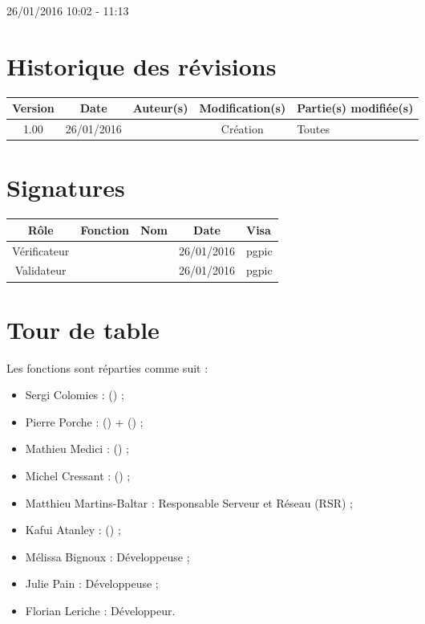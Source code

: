 \documentclass [a4paper] {article}
\begin{document}
26/01/2016			 				%
\hfill   
\hfill 	 10:02 - 11:13 				%


\section*{Historique des révisions}
\begin{center}
			\begin{tabular}{| c | c | c | c | p{4cm} |}
				\hline
				\rowcolor{Gray}
				Version & Date & Auteur(s) & Modification(s) & Partie(s) modifiée(s)		 \\
				\hline
				1.00 & 26/01/2016 & \Pierre & Création & Toutes \\
		\hline		
			\end{tabular}
		\end{center}

\section*{Signatures}

		\begin{center}
			\begin{tabular}{| c | c | c | c | p{4cm} |}
				\hline
				\rowcolor{Gray}
				Rôle & Fonction & Nom & Date & Visa		 \\
				\hline
				Vérificateur & \RQA & \Kafui & 26/01/2016 & pgpic \\[30pt]
				\hline
				Validateur & \CP & \Sergi & 26/01/2016 & pgpic \\[30pt]	
				\hline
			\end{tabular}
		\end{center}


\section{Tour de table}
Les fonctions sont réparties comme suit :
\begin{itemize}
	\item Sergi Colomies : \CP (\CPCourt) ;
	\item Pierre Porche : \RQ (\RQCourt) + \CPA (\CPACourt) ;
	\item Mathieu Medici : \RGC (\RGCCourt) ;
	\item Michel Cressant : \RD (\RDCourt) ;
	\item Matthieu Martins-Baltar : Responsable Serveur et Réseau (RSR) ;
	\item Kafui Atanley : \RQA (\RQACourt) ;
	\item Mélissa Bignoux : Développeuse ;
	\item Julie Pain : Développeuse ;
	\item Florian Leriche : Développeur.


\end{itemize}
\end{document}
